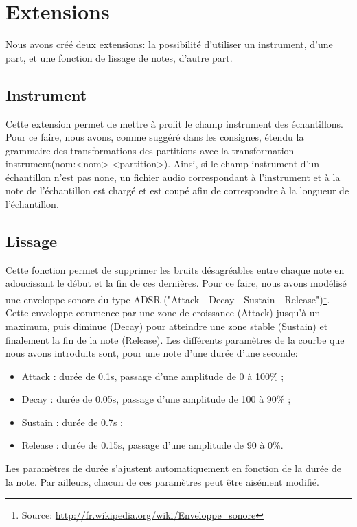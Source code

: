 \documentclass[10pt,a4paper]{article}
\begin{document}
\section{Extensions}
Nous avons créé deux extensions: la possibilité d'utiliser un instrument, d'une part, et une fonction de lissage de notes, d'autre part.

\subsection{Instrument}
Cette extension permet de mettre à profit le champ instrument des échantillons. Pour ce faire, 
nous avons, comme suggéré dans les consignes, étendu la grammaire des transformations des 
partitions avec la transformation instrument(nom:<nom> <partition>). 
Ainsi, si le champ instrument d'un échantillon n'est pas none, un fichier audio correspondant
à l'instrument et à la note de l'échantillon est chargé et est coupé afin de correspondre à la longueur de l'échantillon. 

\subsection{Lissage}
Cette fonction permet de supprimer les bruits désagréables entre chaque note en adoucissant 
le début et la fin de ces dernières. Pour ce faire, nous avons modélisé une enveloppe sonore 
du type ADSR ("Attack - Decay - Sustain - Release")\footnote{Source: \url{http://fr.wikipedia.org/wiki/Enveloppe_sonore}}.
Cette enveloppe commence par une zone de croissance (Attack) jusqu'à un maximum, puis diminue (Decay) pour atteindre 
une zone stable (Sustain) et finalement la fin de la note (Release). Les différents paramètres de la courbe que 
nous avons introduits sont, pour une note d'une durée d'une seconde: 

\begin{itemize}
	\item Attack : durée de 0.1s, passage d'une amplitude de 0 à 100\% ;
	\item Decay : durée de 0.05s, passage d'une amplitude de 100 à 90\% ;
	\item Sustain : durée de 0.7s ;
	\item Release : durée de 0.15s, passage d'une amplitude de 90 à 0\%.
\end{itemize}

Les paramètres de durée s'ajustent automatiquement en fonction de la durée de la note. 
Par ailleurs, chacun de ces paramètres peut être aisément modifié. 
\end{document}
